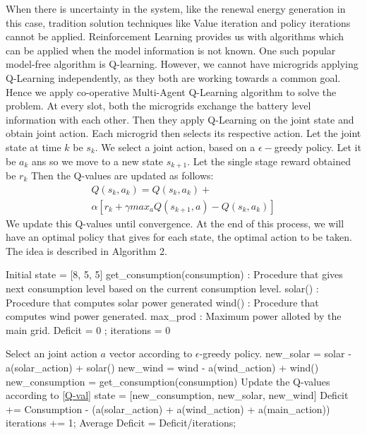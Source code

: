 \documentclass[conference]{IEEEtran}
\begin{document}
When there is uncertainty in the system, like the renewal energy generation in this case, tradition solution techniques like Value iteration and policy iterations cannot be applied. Reinforcement Learning provides us with algorithms which can be applied when the model information is not known. One such popular model-free algorithm is Q-learning. However, we cannot have microgrids applying Q-Learning independently, as they both are working towards a common goal. Hence we apply co-operative Multi-Agent Q-Learning algorithm to solve the problem. At every slot, both the microgrids exchange the battery level information with each other. Then they apply Q-Learning on the joint state and obtain joint action. Each microgrid then selects its respective action. Let the joint state at time $k$ be $s_{k}$. We select a joint action, based on a $\epsilon-$greedy policy. Let it be $a_{k}$ ans so we move to a new state $s_{k+1}$. Let the single stage reward obtained be $r_{k}$ Then the Q-values are updated as follows:
\begin{equation}\label{Q-val}
\begin{split}
Q(s_{k},a_{k}) = Q(s_{k},a_{k}) + \\
 \alpha[r_{k}+\gamma max_{a}Q(s_{k+1},a) - Q(s_{k},a_{k})] 
\end{split}
\end{equation}
We update this Q-values until convergence. At the end of this process, we will have an optimal policy that gives for each state, the optimal action to be taken. The idea is described in  Algorithm 2. 

\begin{algorithm}
\caption{}
\label{q-learning}
\begin{algorithmic}[1]
	\State Initial state = [8, 5, 5] 
    \State get\_consumption(consumption) : Procedure that gives next consumption level based on the current consumption level.
    \State solar() : Procedure that computes solar power generated
    \State wind() : Procedure that computes wind power generated.
    \State max\_prod : Maximum power alloted by the main grid.
    \State Deficit = 0 ; iterations = 0
     
     \State Select an joint action $a$ vector according to $\epsilon$-greedy policy.
     \State new\_solar = solar - a(solar\_action) + solar()
     \State new\_wind = wind - a(wind\_action) + wind()
     \State new\_consumption = get\_consumption(consumption)
     \State Update the Q-values according to \eqref{Q-val}
     \State state = [new\_consumption, new\_solar, new\_wind]
     \State Deficit += Consumption - (a(solar\_action) + a(wind\_action) + a(main\_action))
     \State iterations += 1;
    \EndProcedure
    \State Average Deficit = Deficit/iterations;
\end{algorithmic}
\end{algorithm}
\end{document}
